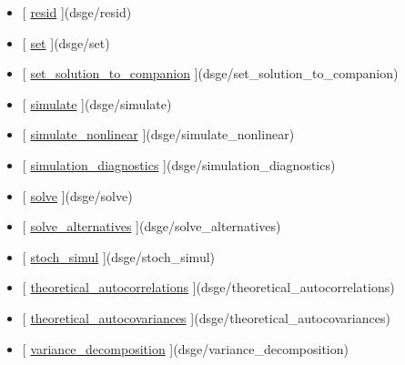 \documentclass[letterpaper,10pt,english]{sphinxmanual}
\begin{document}
\begin{itemize}
\item {} 
{[} {\hyperref[classes/models/@dsge/dsge:resid]{resid}} {]}(dsge/resid)

\item {} 
{[} {\hyperref[classes/models/@dsge/dsge:set]{set}} {]}(dsge/set)

\item {} 
{[} {\hyperref[classes/models/@dsge/dsge:set-solution-to-companion]{set\_solution\_to\_companion}} {]}(dsge/set\_solution\_to\_companion)

\item {} 
{[} {\hyperref[classes/models/@dsge/dsge:simulate]{simulate}} {]}(dsge/simulate)

\item {} 
{[} {\hyperref[classes/models/@dsge/dsge:simulate-nonlinear]{simulate\_nonlinear}} {]}(dsge/simulate\_nonlinear)

\item {} 
{[} {\hyperref[classes/models/@dsge/dsge:simulation-diagnostics]{simulation\_diagnostics}} {]}(dsge/simulation\_diagnostics)

\item {} 
{[} {\hyperref[classes/models/@dsge/dsge:solve]{solve}} {]}(dsge/solve)

\item {} 
{[} {\hyperref[classes/models/@dsge/dsge:solve-alternatives]{solve\_alternatives}} {]}(dsge/solve\_alternatives)

\item {} 
{[} {\hyperref[classes/models/@dsge/dsge:stoch-simul]{stoch\_simul}} {]}(dsge/stoch\_simul)

\item {} 
{[} {\hyperref[classes/models/@dsge/dsge:theoretical-autocorrelations]{theoretical\_autocorrelations}} {]}(dsge/theoretical\_autocorrelations)

\item {} 
{[} {\hyperref[classes/models/@dsge/dsge:theoretical-autocovariances]{theoretical\_autocovariances}} {]}(dsge/theoretical\_autocovariances)

\item {} 
{[} {\hyperref[classes/models/@dsge/dsge:variance-decomposition]{variance\_decomposition}} {]}(dsge/variance\_decomposition)

\end{itemize}
\end{document}
